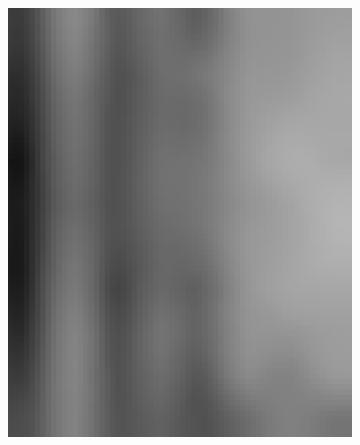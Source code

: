 \begin{figure}[h!]
\begin{subfigure}{0.22\textwidth}
		\includegraphics[width=\linewidth]{Images/KDDProcess/sixthFilter}
		\caption{}    %
		\label{subfig:sixthFilter}
	\end{subfigure}
	\hfill
	\begin{subfigure}{0.22\textwidth}

\end{subfigure}
\end{figure}
